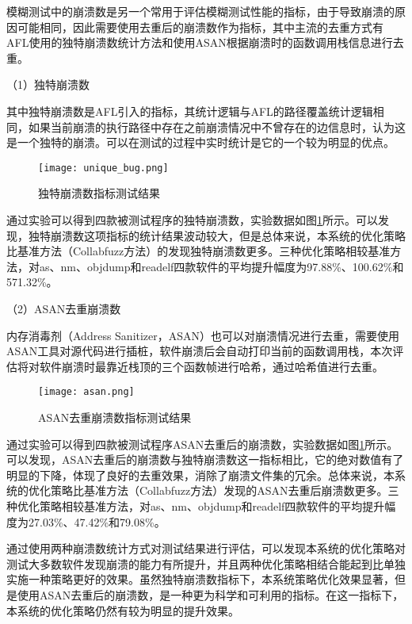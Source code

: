 \documentclass[master]{thesis-uestc}
\begin{document}
模糊测试中的崩溃数是另一个常用于评估模糊测试性能的指标，由于导致崩溃的原因可能相同，因此需要使用去重后的崩溃数作为指标，其中主流的去重方式有AFL使用的独特崩溃数统计方法和使用ASAN根据崩溃时的函数调用栈信息进行去重。

（1）独特崩溃数

其中独特崩溃数是AFL引入的指标，其统计逻辑与AFL的路径覆盖统计逻辑相同，如果当前崩溃的执行路径中存在之前崩溃情况中不曾存在的边信息时，认为这是一个独特的崩溃。可以在测试的过程中实时统计是它的一个较为明显的优点。

\begin{figure}[!htbp]
    \vspace{6pt}
    \centering
    \texttt{[image: unique\_bug.png]}
    \caption{独特崩溃数指标测试结果}
    \label{unique_bug}
\end{figure}

通过实验可以得到四款被测试程序的独特崩溃数，实验数据如图\ref{unique_bug}所示。可以发现，独特崩溃数这项指标的统计结果波动较大，但是总体来说，本系统的优化策略比基准方法（Collabfuzz方法）的发现独特崩溃数更多。三种优化策略相较基准方法，对as、nm、objdump和readelf四款软件的平均提升幅度为97.88\%、100.62\%和571.32\%。

（2）ASAN去重崩溃数

内存消毒剂（Address Sanitizer，ASAN）也可以对崩溃情况进行去重，需要使用ASAN工具对源代码进行插桩，软件崩溃后会自动打印当前的函数调用栈，本次评估将对软件崩溃时最靠近栈顶的三个函数帧进行哈希，通过哈希值进行去重。

\begin{figure}[!htbp]
    \vspace{6pt}
    \centering
    \texttt{[image: asan.png]}
    \caption{ASAN去重崩溃数指标测试结果}
    \label{asan_bug}
\end{figure}

通过实验可以得到四款被测试程序ASAN去重后的崩溃数，实验数据如图\ref{unique_bug}所示。可以发现，ASAN去重后的崩溃数与独特崩溃数这一指标相比，它的绝对数值有了明显的下降，体现了良好的去重效果，消除了崩溃文件集的冗余。总体来说，本系统的优化策略比基准方法（Collabfuzz方法）发现的ASAN去重后崩溃数更多。三种优化策略相较基准方法，对as、nm、objdump和readelf四款软件的平均提升幅度为27.03\%、47.42\%和79.08\%。

通过使用两种崩溃数统计方式对测试结果进行评估，可以发现本系统的优化策略对测试大多数软件发现崩溃的能力有所提升，并且两种优化策略相结合能起到比单独实施一种策略更好的效果。虽然独特崩溃数指标下，本系统策略优化效果显著，但是使用ASAN去重后的崩溃数，是一种更为科学和可利用的指标。在这一指标下，本系统的优化策略仍然有较为明显的提升效果。
\end{document}
